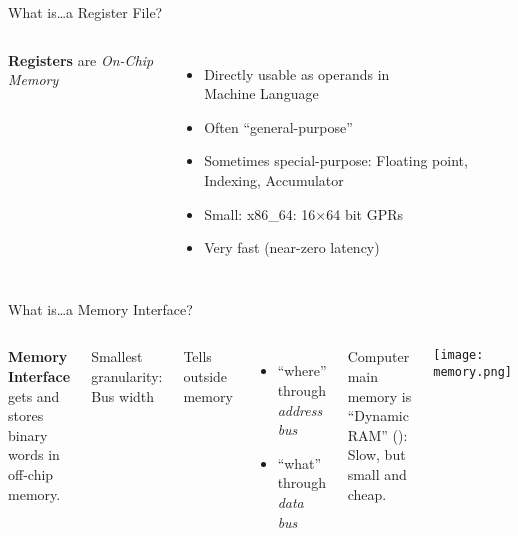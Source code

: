 \documentclass[english,compress]{beamer}
\begin{document}
\begin{frame}{What is\dots a Register File?}
  \begin{columns}
      \textbf{Registers} are \emph{On-Chip Memory}

      \begin{itemize}
        \item
        Directly usable as operands in\\
        Machine Language

        \item
        Often ``general-purpose''

        \item
        Sometimes special-purpose: Floating point, Indexing,
        Accumulator

        \item
        Small: x86\_64: 16$\times$64 bit GPRs

        \item Very fast (near-zero latency)
      \end{itemize}

  \end{columns}
\end{frame}

\begin{frame}{What is\dots a Memory Interface?}
  \begin{columns}
      \textbf{Memory Interface} gets and stores binary words in
      off-chip memory.
      \medskip

      Smallest granularity: Bus width
      \medskip

      Tells outside memory
      \begin{itemize}
        \item ``where'' through \emph{address bus}
        \item ``what'' through \emph{data bus}
      \end{itemize}

      Computer main memory is ``Dynamic RAM''
      ():
      Slow, but small and cheap.

      \texttt{[image: memory.png]}
  \end{columns}
\end{frame}
\end{document}
